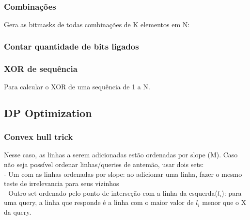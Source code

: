\subsubsection{Combinações}
Gera as bitmasks de todas combinações de K elementos em N:

\subsubsection{Contar quantidade de bits ligados}

\subsubsection{XOR de sequ\^{e}ncia}
Para calcular o XOR de uma sequ\^{e}ncia de 1 a N.
\divisor

\subsection{DP Optimization}
\subsubsection{Convex hull trick}
Nesse caso, as linhas a serem adicionadas est\~{a}o ordenadas por slope (M). Caso n\~{a}o seja poss\'{i}vel ordenar linhas/queries de antem\~{a}o, usar dois sets:\\
- Um com as linhas ordenadas por slope: ao adicionar uma linha, fazer o mesmo teste de irrelevancia para seus vizinhos\\
- Outro set ordenado pelo ponto de interse\c{c}\~{a}o com a linha da esquerda($l_i$): para uma query, a linha que responde \'{e} a linha com o maior valor de $l_i$ menor que o X da query.

\divisor
